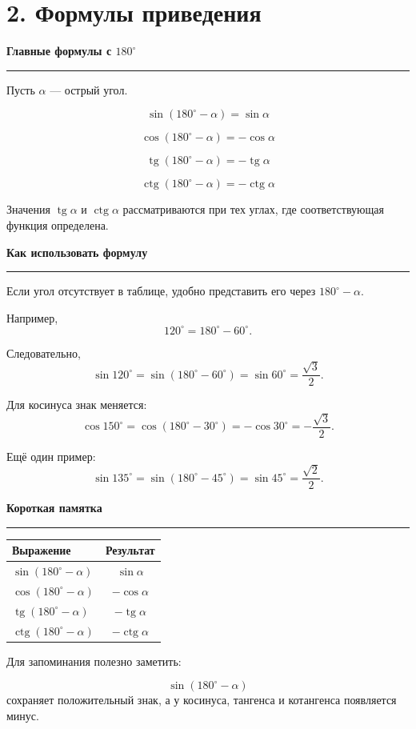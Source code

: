\documentclass[a4paper,12pt]{article}
\DeclareMathOperator{\tg}{tg}
\DeclareMathOperator{\ctg}{ctg}
\newcommand{\accentline}{%
    \vspace{0.2em}
    {\color{accent}\rule{\linewidth}{0.6pt}}
    \vspace{0.5em}
}
\newcommand{\topic}[1]{%
    \vspace{0.5em}
    {\large\bfseries\color{darkaccent}#1}\par
    \accentline
}
\begin{document}
\section*{\color{darkaccent}2. Формулы приведения}

\topic{Главные формулы с $180^\circ$}

Пусть $\alpha$ --- острый угол.

\[
\boxed{\sin(180^\circ-\alpha)=\sin\alpha}
\]

\[
\boxed{\cos(180^\circ-\alpha)=-\cos\alpha}
\]

\[
\boxed{\tg(180^\circ-\alpha)=-\tg\alpha}
\]

\[
\boxed{\ctg(180^\circ-\alpha)=-\ctg\alpha}
\]

Значения $\tg\alpha$ и $\ctg\alpha$ рассматриваются при тех углах,
где соответствующая функция определена.

\topic{Как использовать формулу}

Если угол отсутствует в таблице, удобно представить его через
$180^\circ-\alpha$.

Например,
\[
120^\circ=180^\circ-60^\circ.
\]

Следовательно,
\[
\sin120^\circ
=
\sin(180^\circ-60^\circ)
=
\sin60^\circ
=
\frac{\sqrt3}{2}.
\]

Для косинуса знак меняется:
\[
\cos150^\circ
=
\cos(180^\circ-30^\circ)
=
-\cos30^\circ
=
-\frac{\sqrt3}{2}.
\]

Ещё один пример:
\[
\sin135^\circ
=
\sin(180^\circ-45^\circ)
=
\sin45^\circ
=
\frac{\sqrt2}{2}.
\]

\topic{Короткая памятка}

\begin{center}
\renewcommand{\arraystretch}{1.45}
\begin{tabularx}{0.84\linewidth}{>{\raggedright\arraybackslash}X c}
\toprule
Выражение & Результат\\
\midrule
$\sin(180^\circ-\alpha)$ & $\sin\alpha$\\
$\cos(180^\circ-\alpha)$ & $-\cos\alpha$\\
$\tg(180^\circ-\alpha)$ & $-\tg\alpha$\\
$\ctg(180^\circ-\alpha)$ & $-\ctg\alpha$\\
\bottomrule
\end{tabularx}
\end{center}

Для запоминания полезно заметить:

\[
\sin(180^\circ-\alpha)
\]
сохраняет положительный знак, а у косинуса, тангенса и котангенса
появляется минус.
\end{document}
